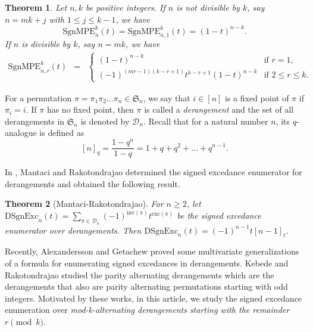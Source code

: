 \documentclass[12pt]{article}
\newcommand{\SMPE}{\mathrm{SgnMPE}}
\newcommand{\SSS}{\mathfrak{S}}
\newcommand{\inv}{\mathrm{inv}}
\newcommand{\exc}{\mathrm{exc}}
\newcommand{\DSE}{ \mathrm{DSgnExc}}
\newtheorem{theorem}{\bf Theorem}[section]
\begin{document}
\begin{theorem}
\label{thm:signed excedance-modk}
Let $n,k$ be positive integers. If $n$ is not divisible by $k$, say $n=mk+j$ with $1 \leq j \leq k-1$, we have 
\[\SMPE_n^k(t)= \SMPE_{n,1}^k(t)= (1-t)^{n-k} .  \] 
If $n$ is divisible by $k$, say $n=mk$, we have 
\begin{eqnarray*}
\SMPE_{n,r}^k(t)  & = & \begin{cases}
(1-t)^{n-k} & \text {if $r=1$}, \\
(-1)^{(mr-1)(k-r+1)} t^{k-r+1} (1-t)^{n-k} & \text {if $2 \leq r \leq k$}.
 \end{cases}
\end{eqnarray*} 
\end{theorem} 




For a permutation $\pi = \pi_1 \pi_2 \dots \pi_n \in \SSS_n$, we say that $i \in [n]$ is a fixed point of $\pi$ if $\pi_i=i.$  If $\pi$ has no fixed point, then $\pi$ is called a \textit{derangement} and the set of all derangements in $\SSS_n$ is denoted by $\mathcal{D}_n$.  Recall that for a natural number $n$, its $q$-analogue is defined as 
\[ [n]_q=\frac{1-q^n}{1-q}=1+q+q^2+\hdots+q^{n-1}. \]



In \cite{Mantaci-rako-xc-derange}, Mantaci and Rakotondrajao determined the signed excedance enumerator for derangements and obtained the following result.

\begin{theorem}[Mantaci-Rakotondrajao] 
 For $n\geq 2$, let $\DSE_n(t)=\sum_{\pi \in \mathcal{D}_n}(-1)^{\inv(\pi)} t^{\exc(\pi)}$ be the signed excedance enumerator over derangements. Then  $\DSE_n(t)=(-1)^{n-1}t[n-1]_t$.    
\end{theorem}

Recently, Alexandersson and Getachew \cite{alexandersson-getachew} proved some multivariate generalizations of a formula for enumerating signed excedances in derangements. Kebede and Rakotondrajao \cite{kebede-rakotondrajao} studied the parity alternating derangements which are the derangements that also are parity alternating permutations starting with odd integers. Motivated by these works, in this article, we study the signed excedance enumeration over {\it mod-k-alternating derangements starting with the remainder $r \pmod k$}. 
\end{document}
